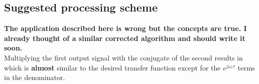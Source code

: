 \subsection*{Suggested processing scheme}
\textbf{The application described here is wrong but the concepts are true. I already thought of a similar corrected algorithm and should write it soon.}\\
Multiplying the first output signal with the conjugate of the second results in
\hfill
which is \textbf{almost} similar to the desired transfer function except for the $e^{j\omega_{i}\tau}$ terms in the denominator. 
